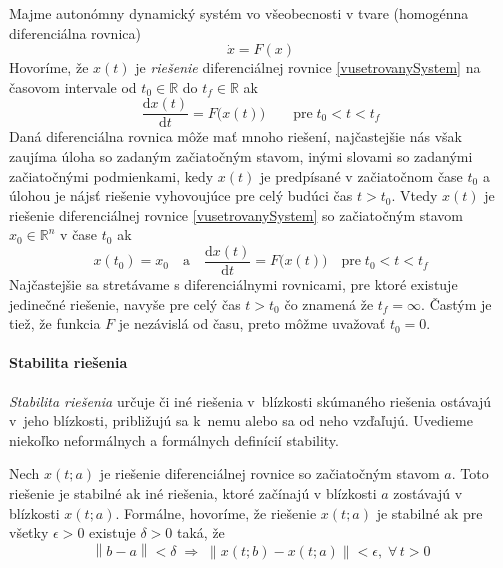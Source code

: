 \documentclass[a4paper, 10pt, ]{article}
\begin{document}
Majme autonómny dynamický systém vo všeobecnosti v tvare (homogénna diferenciálna rovnica) 
\begin{equation} \label{vusetrovanySystem}
	\dot{x} = F(x)
\end{equation}
Hovoríme, že $x(t)$ je \emph{riešenie} diferenciálnej rovnice \eqref{vusetrovanySystem} na časovom intervale od $t_0 \in \mathbb{R}$ do $t_f \in \mathbb{R}$ ak
\begin{equation}
	\frac{\text{d}x(t)}{\text{d}t} = F \big( x(t)  \big) \qquad \text{pre} \; t_0 < t < t_f
\end{equation}
Daná diferenciálna rovnica môže mať mnoho riešení, najčastejšie nás však zaujíma úloha so zadaným začiatočným stavom, inými slovami so zadanými začiatočnými podmienkami, kedy $x(t)$ je predpísané v začiatočnom čase $t_0$ a úlohou je nájsť riešenie vyhovoujúce pre celý budúci čas $t>t_0$. Vtedy $x(t)$ je riešenie diferenciálnej rovnice \eqref{vusetrovanySystem} so začiatočným stavom $x_0 \in \mathbb{R}^n$ v čase $t_0$ ak
\begin{equation}
	x(t_0) = x_0 \quad \text{a} \quad \frac{\text{d}x(t)}{\text{d}t} = F \big( x(t)  \big) \quad \text{pre} \; t_0 < t < t_f
\end{equation}
Najčastejšie sa stretávame s diferenciálnymi rovnicami, pre ktoré existuje jedinečné riešenie, navyše pre celý čas $t>t_0$ čo znamená že $t_f = \infty$. Častým je tiež, že funkcia $F$ je nezávislá od času, preto môžme uvažovať $t_0 = 0$.


\paragraph{Stabilita riešenia}

\emph{Stabilita riešenia} určuje či iné riešenia v~blízkosti skúmaného riešenia ostávajú v~jeho blízkosti, približujú sa k~nemu alebo sa od neho vzďaľujú. Uvedieme niekoľko neformálnych a formálnych definícií stability.


Nech $x(t;a)$ je riešenie diferenciálnej rovnice so začiatočným stavom $a$. Toto riešenie je stabilné ak iné riešenia, ktoré začínajú v blízkosti $a$ zostávajú v blízkosti $x(t;a)$. Formálne, hovoríme, že riešenie $x(t;a)$ je stabilné ak pre všetky $\epsilon > 0$ existuje $\delta > 0$ taká, že
\begin{equation} \label{stabilDef}
	\left\| b - a \right\| < \delta \; \Rightarrow \; \left\| x(t;b) - x(t;a) \right\| < \epsilon, \; \forall \, t>0
\end{equation}
\end{document}
